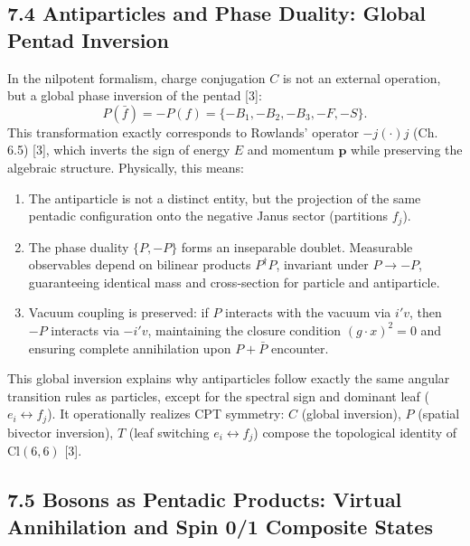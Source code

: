 \documentclass[11pt]{article}
\providecommand{\tightlist}{\setlength{\itemsep}{2pt}\setlength{\parskip}{6pt}}
\providecommand{\tightlist}{%
  \setlength{\itemsep}{2pt}\setlength{\parskip}{6pt}
}
\begin{document}
\hypertarget{antiparticles-and-phase-duality-global-pentad-inversion}{%
\subsection{7.4 Antiparticles and Phase Duality: Global Pentad
Inversion}\label{antiparticles-and-phase-duality-global-pentad-inversion}}

In the nilpotent formalism, charge conjugation \(C\) is not an external
operation, but a global phase inversion of the pentad {[}3{]}: \[
P(\bar{f}) = -P(f) = \{-B_1, -B_2, -B_3, -F, -S\}.
\] This transformation exactly corresponds to Rowlands' operator
\(-j(\cdot)j\) (Ch. 6.5) {[}3{]}, which inverts the sign of energy \(E\)
and momentum \(\mathbf{p}\) while preserving the algebraic structure.
Physically, this means:

\begin{enumerate}
\def\labelenumi{\arabic{enumi}.}
\tightlist
\item
  The antiparticle is not a distinct entity, but the projection of the
  same pentadic configuration onto the negative Janus sector (partitions
  \(f_j\)).
\item
  The phase duality \(\{P, -P\}\) forms an inseparable doublet.
  Measurable observables depend on bilinear products \(P^\dagger P\),
  invariant under \(P \to -P\), guaranteeing identical mass and
  cross-section for particle and antiparticle.
\item
  Vacuum coupling is preserved: if \(P\) interacts with the vacuum via
  \(i'v\), then \(-P\) interacts via \(-i'v\), maintaining the closure
  condition \((g \cdot x)^2 = 0\) and ensuring complete annihilation
  upon \(P + \bar{P}\) encounter.
\end{enumerate}

This global inversion explains why antiparticles follow exactly the same
angular transition rules as particles, except for the spectral sign and
dominant leaf (\(e_i \leftrightarrow f_j\)). It operationally realizes
CPT symmetry: \(C\) (global inversion), \(P\) (spatial bivector
inversion), \(T\) (leaf switching \(e_i \leftrightarrow f_j\)) compose
the topological identity of \(\text{Cl}(6,6)\) {[}3{]}.

\hypertarget{bosons-as-pentadic-products-virtual-annihilation-and-spin-01-composite-states}{%
\subsection{7.5 Bosons as Pentadic Products: Virtual Annihilation and
Spin 0/1 Composite
States}\label{bosons-as-pentadic-products-virtual-annihilation-and-spin-01-composite-states}}
\end{document}
